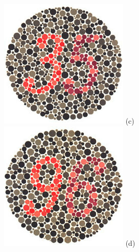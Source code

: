 \documentclass[	12pt, Times, openright, twoside, a4paper, english, brazil]{abntex2}
\begin{document}
\begin{apendicesenv}
\begin{figure}[!htb]
\centering
{\includegraphics[width=\linewidth]{ishihara-classificacao/plate24.jpg}}
(c)
\endminipage\hfill
{}
\centering
{\includegraphics[width=\linewidth]{ishihara-classificacao/plate25.jpg}}
(d)
\endminipage\hfill


\end{figure}
\end{apendicesenv}
\end{document}
